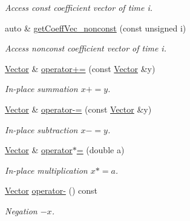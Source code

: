 \begin{DoxyCompactItemize}
\begin{DoxyCompactList}\small\item\em Access const coefficient vector of time i. \end{DoxyCompactList}\item 
\hypertarget{classSpacy_1_1KaskadeParabolic_1_1Vector_af7b18035926b7f8826d874405edc934a}{auto \& \hyperlink{classSpacy_1_1KaskadeParabolic_1_1Vector_af7b18035926b7f8826d874405edc934a}{get\-Coeff\-Vec\-\_\-nonconst} (const unsigned i)}\label{classSpacy_1_1KaskadeParabolic_1_1Vector_af7b18035926b7f8826d874405edc934a}

\begin{DoxyCompactList}\small\item\em Access nonconst coefficient vector of time i. \end{DoxyCompactList}\item 
\hyperlink{classSpacy_1_1KaskadeParabolic_1_1Vector}{Vector} \& \hyperlink{classSpacy_1_1KaskadeParabolic_1_1Vector_a43ee5b5c32a5204827afa7ce1e6ad439}{operator+=} (const \hyperlink{classSpacy_1_1KaskadeParabolic_1_1Vector}{Vector} \&y)
\begin{DoxyCompactList}\small\item\em In-\/place summation $ x+=y$. \end{DoxyCompactList}\item 
\hyperlink{classSpacy_1_1KaskadeParabolic_1_1Vector}{Vector} \& \hyperlink{classSpacy_1_1KaskadeParabolic_1_1Vector_acdfe83aee187f4d72a372127cdf92617}{operator-\/=} (const \hyperlink{classSpacy_1_1KaskadeParabolic_1_1Vector}{Vector} \&y)
\begin{DoxyCompactList}\small\item\em In-\/place subtraction $ x-=y$. \end{DoxyCompactList}\item 
\hyperlink{classSpacy_1_1KaskadeParabolic_1_1Vector}{Vector} \& \hyperlink{classSpacy_1_1KaskadeParabolic_1_1Vector_a4efec0b956b8e53042c6cf17ffa20af2}{operator$\ast$=} (double a)
\begin{DoxyCompactList}\small\item\em In-\/place multiplication $ x*=a$. \end{DoxyCompactList}\item 
\hyperlink{classSpacy_1_1KaskadeParabolic_1_1Vector}{Vector} \hyperlink{classSpacy_1_1KaskadeParabolic_1_1Vector_a527fe4a3bef0d1907fa15886fe5d3409}{operator-\/} () const 
\begin{DoxyCompactList}\small\item\em Negation $ -x$. \end{DoxyCompactList}\item 

\end{DoxyCompactItemize}

